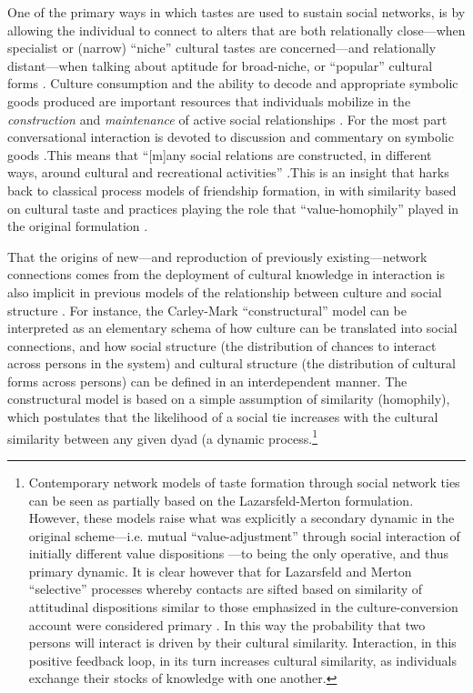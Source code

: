 \documentclass[12pt]{article}
\begin{document}
One of the primary ways in which tastes are used to sustain social networks, is by allowing the individual to connect to alters that are both relationally close---when specialist or (narrow) ``niche'' cultural tastes are concerned---and relationally distant---when talking about aptitude for broad-niche, or ``popular'' cultural forms \citep{lizardo06a}. Culture consumption and the ability to decode and appropriate symbolic goods produced are important resources that individuals mobilize in the \emph{construction} and \emph{maintenance} of active social relationships \citep{cardon_granjon05, dimaggio87, fine77}.  For the most part conversational interaction is devoted to discussion and commentary on symbolic goods \citep{fine77, dimaggio87}.This means that ``[m]any social relations are constructed, in different ways, around cultural and recreational activities'' \citep{cardon_granjon05}.This is an insight that harks back to classical process models of friendship formation, in with similarity based on cultural taste and practices \citep{mark98b}playing the role that ``value-homophily'' played in the original formulation \citep{lazarsfeld_merton54}. 

That the origins of new---and reproduction of previously existing---network connections comes from the deployment of cultural knowledge in interaction is also implicit in previous models of the relationship between culture and social structure \citep{carley91, carley95, fine79, mark98a, mark03}. For instance, the Carley-Mark \citep{carley91, mark98a} ``constructural'' model can be interpreted as an elementary schema of how culture can be translated into social connections, and how social structure (the distribution of chances to interact across persons in the system) and cultural structure (the distribution of cultural forms across persons) can be defined in an interdependent manner. The constructural model is based on a simple assumption of similarity (homophily), which postulates that the likelihood of a social tie increases with the cultural similarity between any given dyad (a dynamic process.\footnote{Contemporary network models of taste formation through social network ties \citep{mark98b} can be seen as partially based on the Lazarsfeld-Merton formulation. However, these models raise what was explicitly a secondary dynamic in the original scheme---i.e. mutual ``value-adjustment'' through social interaction of initially different value dispositions \citeyearpar[33]{lazarsfeld_merton54}---to being the only operative, and thus primary dynamic. It is clear however that for Lazarsfeld and Merton ``selective'' processes whereby contacts are sifted based on similarity of attitudinal dispositions similar to those emphasized in the culture-conversion account were considered primary \citeyearpar[22-29]{lazarsfeld_merton54}. In this way the probability that two persons will interact is driven by their cultural similarity. Interaction, in this positive feedback loop, in its turn increases cultural similarity, as individuals exchange their stocks of knowledge with one another.}
\end{document}
